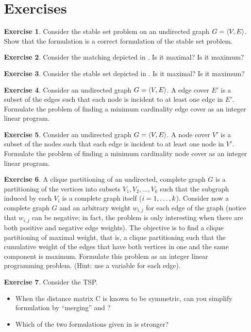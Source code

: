 \documentclass[titlepage]{book}
\theoremstyle{plain}
\theoremstyle{definition}
\newtheorem{exercise}{Exercise}[chapter]
\theoremstyle{remark}
\begin{document}
\section*{Exercises}
\begin{exercise}
Consider the stable set problem on an undirected graph $G=\tupl{V,E}$. Show that the formulation  is a correct formulation of the stable set problem.
\end{exercise}
\begin{exercise}
Consider the matching depicted in . Is it maximal? Is it maximum?
\end{exercise}
\begin{exercise}
Consider the stable set depicted in . Is it maximal? Is it maximum?
\end{exercise}
\begin{exercise}
Consider an undirected graph $G=\tupl{V,E}$. A edge cover $E'$ is a subset of the edges such that each node is incident to at least one edge in $E'$. Formulate the problem of finding a minimum cardinality edge cover as an integer linear program.
\end{exercise}
\begin{exercise}
Consider an undirected graph $G=\tupl{V,E}$. A node cover $V'$ is a subset of the nodes such that each edge is incident to at least one node in $V'$. Formulate the problem of finding a minimum cardinality node cover as an integer linear program.
\end{exercise}
\begin{exercise}
A clique partitioning of an undirected, complete graph $G$ is a partitioning of the vertices into subsets $V_1,V_2,\ldots,V_k$ such that the subgraph induced by each $V_i$ is a complete graph itself ($\rangei[i]{1}{k}$). Consider now a complete graph $G$ and an arbitrary weight $w_{i,j}$ for each edge of the graph (notice that $w_{i,j}$ can be negative; in fact, the problem is only interesting when there are both positive and negative edge weights). The objective is to find a clique partitioning of maximal weight, that is, a clique partitioning such that the cumulative weight of the edges that have both vertices in one and the same component is maximum. Formulate this problem as an integer linear programming problem. (Hint: use a variable for each edge).
\end{exercise}
\begin{exercise}
Consider the TSP.
\begin{itemize}
 \item When the distance matrix C is known to be symmetric, can you simplify formulation  by ``merging''  and ?
 \item Which of the two formulations given in  is stronger?
\end{itemize}
\end{exercise}
\end{document}
